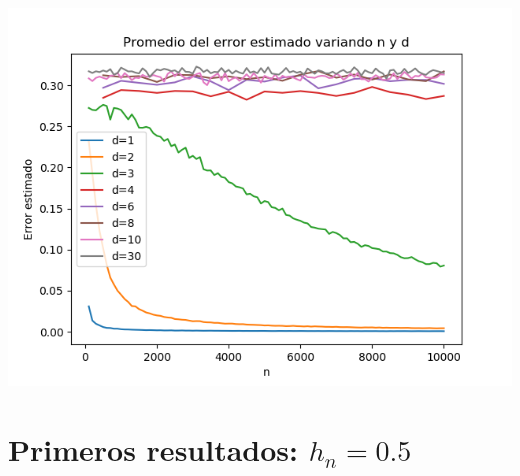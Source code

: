 \documentclass[12pt, a4paper]{article}
\begin{document}
\includegraphics[width=\textwidth]{figuras_h=0.1/resultados-grales}


\section{Primeros resultados: $h_n=0.5$}
\end{document}
